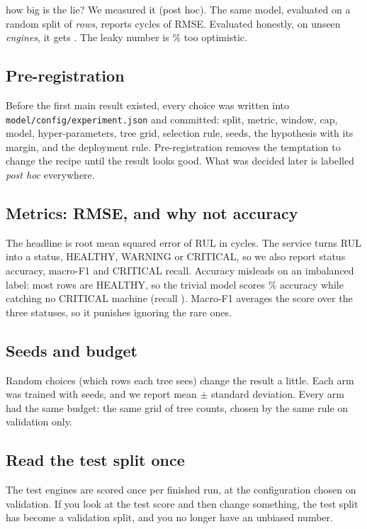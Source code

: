 \documentclass[11pt,a4paper]{article}
\begin{document}
\begin{keyidea}{how big is the lie?}
We measured it (post hoc). The same model, evaluated on a random split of \emph{rows}, reports
\RowsplitRmse{} cycles of RMSE. Evaluated honestly, on unseen \emph{engines}, it gets \MainGbrFullTwoOneTestRmse{}.
The leaky number is \RowsplitOptimismPct{}\% too optimistic.
\end{keyidea}

\subsection{Pre-registration}
Before the first main result existed, every choice was written into \texttt{model/config/experiment.json} and
committed: split, metric, window, cap, model, hyper-parameters, tree grid, selection rule, seeds, the hypothesis
with its margin, and the deployment rule. Pre-registration removes the temptation to change the recipe until the
result looks good. What was decided later is labelled \emph{post hoc} everywhere.

\subsection{Metrics: RMSE, and why not accuracy}
The headline is root mean squared error of RUL in cycles. The service turns RUL into a status, HEALTHY,
WARNING or CRITICAL, so we also report status accuracy, macro-F1 and CRITICAL recall. Accuracy misleads on an
imbalanced label: most rows are HEALTHY, so the trivial model scores \BaselineTrivialMeanFullTwoOneStatusAccPct{}\%
accuracy while catching no CRITICAL machine (recall \BaselineTrivialMeanFullTwoOneCriticalRecall{}). Macro-F1
averages the score over the three statuses, so it punishes ignoring the rare ones.

\subsection{Seeds and budget}
Random choices (which rows each tree sees) change the result a little. Each arm was trained with
\NSeeds{} seeds, and we report mean $\pm$ standard deviation. Every arm had the same budget: the same grid of tree
counts, chosen by the same rule on validation only.

\subsection{Read the test split once}
The test engines are scored once per finished run, at the configuration chosen on validation. If you look at the
test score and then change something, the test split has become a validation split, and you no longer have an
unbiased number.
\end{document}
